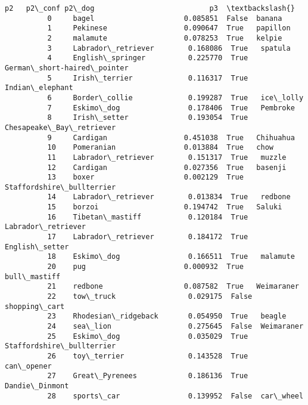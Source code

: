 \documentclass[11pt]{article}
\begin{document}
\begin{Verbatim}[commandchars=\\\{\}]
                                      p2   p2\_conf p2\_dog                           p3  \textbackslash{}
          0     bagel                     0.085851  False  banana                        
          1     Pekinese                  0.090647  True   papillon                      
          2     malamute                  0.078253  True   kelpie                        
          3     Labrador\_retriever        0.168086  True   spatula                       
          4     English\_springer          0.225770  True   German\_short-haired\_pointer   
          5     Irish\_terrier             0.116317  True   Indian\_elephant               
          6     Border\_collie             0.199287  True   ice\_lolly                     
          7     Eskimo\_dog                0.178406  True   Pembroke                      
          8     Irish\_setter              0.193054  True   Chesapeake\_Bay\_retriever      
          9     Cardigan                  0.451038  True   Chihuahua                     
          10    Pomeranian                0.013884  True   chow                          
          11    Labrador\_retriever        0.151317  True   muzzle                        
          12    Cardigan                  0.027356  True   basenji                       
          13    boxer                     0.002129  True   Staffordshire\_bullterrier     
          14    Labrador\_retriever        0.013834  True   redbone                       
          15    borzoi                    0.194742  True   Saluki                        
          16    Tibetan\_mastiff           0.120184  True   Labrador\_retriever            
          17    Labrador\_retriever        0.184172  True   English\_setter                
          18    Eskimo\_dog                0.166511  True   malamute                      
          20    pug                       0.000932  True   bull\_mastiff                  
          21    redbone                   0.087582  True   Weimaraner                    
          22    tow\_truck                 0.029175  False  shopping\_cart                 
          23    Rhodesian\_ridgeback       0.054950  True   beagle                        
          24    sea\_lion                  0.275645  False  Weimaraner                    
          25    Eskimo\_dog                0.035029  True   Staffordshire\_bullterrier     
          26    toy\_terrier               0.143528  True   can\_opener                    
          27    Great\_Pyrenees            0.186136  True   Dandie\_Dinmont                
          28    sports\_car                0.139952  False  car\_wheel                     

\end{Verbatim}
\end{document}
